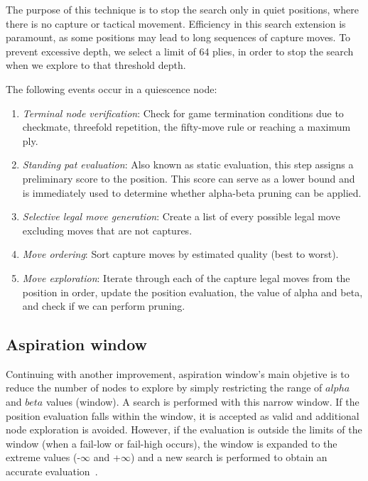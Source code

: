 \noindent The purpose of this technique is to stop the search only in quiet positions, where there is no capture or tactical movement. Efficiency in this search extension is paramount, as some positions may lead to long sequences of capture moves. To prevent excessive depth, we select a limit of 64 plies, in order to stop the search when we explore to that threshold depth.

\vspace{1em}

\noindent The following events occur in a quiescence node:

\begin{enumerate}
    \item \textit{Terminal node verification}: Check for game termination conditions due to checkmate, threefold repetition, the fifty-move rule or reaching a maximum ply.
    \item \textit{Standing pat evaluation}: Also known as static evaluation, this step assigns a preliminary score to the position. This score can serve as a lower bound and is immediately used to determine whether alpha-beta pruning can be applied.
    \item \textit{Selective legal move generation}: Create a list of every possible legal move excluding moves that are not captures.
    \item \textit{Move ordering}: Sort capture moves by estimated quality (best to worst).
    \item \textit{Move exploration}: Iterate through each of the capture legal moves from the position in order, update the position evaluation, the value of alpha and beta, and check if we can perform pruning.
\end{enumerate}

\subsection*{Aspiration window}\label{sec:aspiration-window}

Continuing with another improvement, aspiration window's main objetive is to reduce the number of nodes to explore by simply restricting the range of $alpha$ and $beta$ values (window). A search is performed with this narrow window. If the position evaluation falls within the window, it is accepted as valid and additional node exploration is avoided. However, if the evaluation is outside the limits of the window (when a fail-low or fail-high occurs), the window is expanded to the extreme values (-$\infty$ and +$\infty$) and a new search is performed to obtain an accurate evaluation~\cite{AspirationWindow}.

